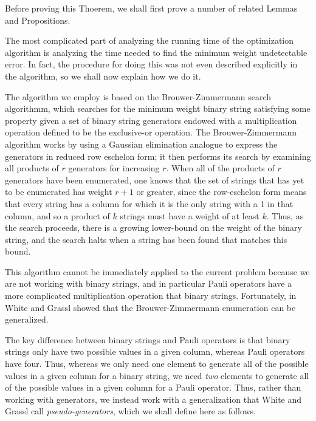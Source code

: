 \documentclass[twocolumn,showpacs,preprintnumbers,amsmath,amssymb,nofootinbib,pra,floatfix]{revtex4-1}
\newenvironment{remark}[1][Remark]{\begin{trivlist}
\item[\hskip \labelsep {\bfseries #1}]}{\end{trivlist}}
\begin{document}
\begin{remark}
Before proving this Thoerem, we shall first prove a number of related Lemmas and Propositions.

The most complicated part of analyzing the running time of the optimization algorithm is analyzing the time needed to find the minimum weight undetectable error.  In fact, the procedure for doing this was not even described explicitly in the algorithm, so we shall now explain how we do it.

The algorithm we employ is based on the Brouwer-Zimmermann search algorithmm, which searches for the minimum weight binary string satisfying some property given a set of binary string generators endowed with a multiplication operation defined to be the exclusive-or operation.  The Brouwer-Zimmermann algorithm works by using a Gaussian elimination analogue to express the generators in reduced row eschelon form;  it then performs its search by examining all products of $r$ generators for increasing $r$.  When all of the products of $r$ generators have been enumerated, one knows that the set of strings that has yet to be enumerated has weight $r+1$ or greater, since the row-eschelon form means that every string has a column for which it is the only string with a 1 in that column, and so a product of $k$ strings must have a weight of at least $k$.  Thus, as the search proceeds, there is a growing lower-bound on the weight of the binary string, and the search halts when a string has been found that matches this bound.

This algorithm cannot be immediately applied to the current problem because we are not working with binary strings, and in particular Pauli operators have a more complicated multiplication operation that binary strings.  Fortunately, in~\cite{White:2006fj} White and Grassl showed that the Brouwer-Zimmermann enumeration can be generalized.

The key difference between binary strings and Pauli operators is that binary strings only have two possible values in a given column, whereas Pauli operators have four.  Thus, whereas we only need one element to generate all of the possible values in a given column for a binary string, we need \emph{two} elements to generate all of the possible values in a given column for a Pauli operator.  Thus, rather than working with generators, we instead work with a generalization that White and Grassl call \emph{pseudo-generators}, which we shall define here as follows.
\end{remark}
\end{document}

